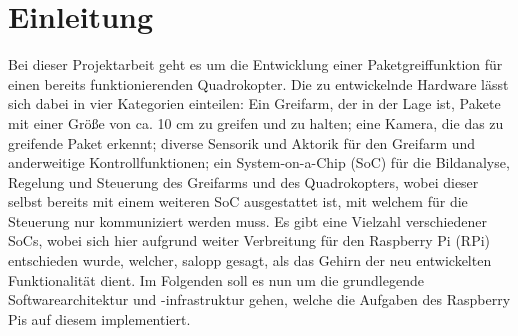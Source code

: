 \section{Einleitung}
Bei dieser Projektarbeit geht es um die Entwicklung einer Paketgreiffunktion für einen
bereits funktionierenden Quadrokopter. Die zu entwickelnde Hardware lässt sich dabei
in vier Kategorien einteilen: Ein Greifarm, der in der Lage ist, Pakete mit einer Größe
von ca. 10 cm zu greifen und zu halten; eine Kamera, die das zu greifende Paket
erkennt; diverse Sensorik und Aktorik für den Greifarm und anderweitige
Kontrollfunktionen; ein System-on-a-Chip (SoC) für die Bildanalyse, Regelung und
Steuerung des Greifarms und des Quadrokopters, wobei dieser selbst bereits mit
einem weiteren SoC ausgestattet ist, mit welchem für die Steuerung nur kommuniziert
werden muss. Es gibt eine Vielzahl verschiedener SoCs, wobei sich hier aufgrund
weiter Verbreitung für den Raspberry Pi (RPi) entschieden wurde, welcher, salopp
gesagt, als das Gehirn der neu entwickelten Funktionalität dient. Im Folgenden soll es
nun um die grundlegende Softwarearchitektur und -infrastruktur gehen, welche die
Aufgaben des Raspberry Pis auf diesem implementiert.